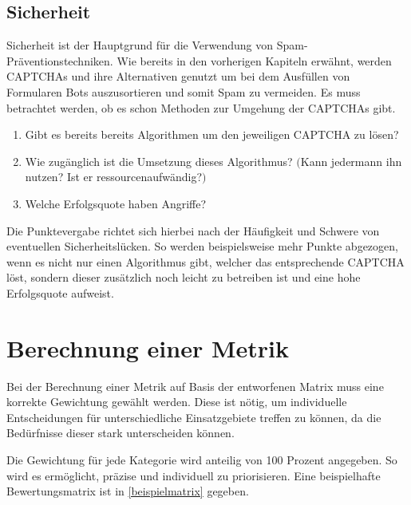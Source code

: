 \subsection{Sicherheit}
\label{ch:matrix:aspekte:sicherheit}
Sicherheit ist der Hauptgrund für die Verwendung von Spam-Präventions\-techniken.
Wie bereits in den vorherigen Kapiteln erwähnt, werden CAPTCHAs und ihre Alternativen genutzt um bei dem Ausfüllen von Formularen Bots auszusortieren
und somit Spam zu vermeiden.
Es muss betrachtet werden, ob es schon Methoden zur Umgehung der CAPTCHAs gibt.
\begin{enumerate}
    \item Gibt es bereits bereits Algorithmen um den jeweiligen CAPTCHA zu lösen?
    \item Wie zugänglich ist die Umsetzung dieses Algorithmus? $($Kann jedermann ihn nutzen? Ist er ressourcenaufwändig?$)$
    \item Welche Erfolgsquote haben Angriffe?
\end{enumerate}

Die Punktevergabe richtet sich hierbei nach der Häufigkeit und Schwere von eventuellen Sicherheitslücken.
So werden beispielsweise mehr Punkte abgezogen, wenn es nicht nur einen Algorithmus gibt, welcher das entsprechende CAPTCHA löst,
sondern dieser zusätzlich noch leicht zu betreiben ist und eine hohe Erfolgsquote aufweist.

\section{Berechnung einer Metrik}
\label{ch:matrix:berechnung}
Bei der Berechnung einer Metrik auf Basis der entworfenen Matrix muss eine korrekte Gewichtung gewählt werden.
Diese ist nötig, um individuelle Entscheidungen für unterschiedliche Einsatzgebiete treffen zu können,
da die Bedürfnisse dieser stark unterscheiden können.

Die Gewichtung für jede Kategorie wird anteilig von 100 Prozent angegeben.
So wird es ermöglicht, präzise und individuell zu priorisieren.
Eine beispielhafte Bewertungsmatrix ist in \ref{beispielmatrix} gegeben.

